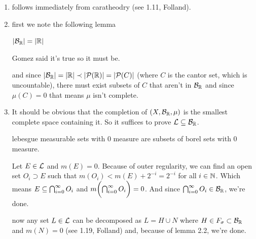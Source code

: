 \documentclass{article}
\begin{document}
\begin{homeworkProblem}
    \begin{enumerate}[label=\alph*.]
        \item follows immediately from caratheodry (see 1.11, Folland).
        \item first we note the following lemma
        \begin{lemma}
            $|\mathcal{B}_{\mathbb{R}}|=|\mathbb{R}|$
        \end{lemma}
        \begin{trivialproof}
            Gomez said it's true so it must be.
        \end{trivialproof}
        and since $|\mathcal{B}_{\mathbb{R}}|=|\mathbb{R}|\prec|\mathcal{P}(\mathbb{R})|=|\mathcal{P}(C)|$ (where $C$ is the cantor set, which is uncountable), there must exist subsets of $C$ that aren't in $\mathcal{B}_{\mathbb{R}}$ and since $\mu(C)=0$ that means $\mu$ isn't complete.
        \item It should be obvious that the completion of $(X, \mathcal{B}_{\mathbb{R}}, \mu)$ is the smallest complete space containing it. So it suffices to prove $\mathcal{L} \subseteq \mathcal{B}_{\mathbb{R}}$.
        \begin{lemma}
            lebesgue measurable sets with 0 measure are subsets of borel sets with 0 measure.
        \end{lemma}
        \begin{trivialproof}
            Let $E\in\mathcal{L}$ and $m(E)=0$. Because of outer regularity, we can find an open set $O_i \supset E$ such that $m(O_i)<m(E)+2^{-i}=2^{-i}$ for all $i\in\mathbb{N}$. Which means $E \subseteq \bigcap_{i=0}^\infty O_i$ and $m\biggl(\bigcap_{i=0}^\infty O_i\biggr)=0$. And since $\bigcap_{i=0}^\infty O_i \in \mathcal{B}_{\mathbb{R}}$, we're done.
        \end{trivialproof}
        now any set $L\in\mathcal{L}$ can be decomposed as $L=H \cup N$ where $H \in F_\sigma \subset \mathcal{B}_{\mathbb{R}}$ and $m(N)=0$ (see 1.19, Folland) and, because of lemma 2.2, we're done.
    \end{enumerate}
\end{homeworkProblem}
\end{document}
